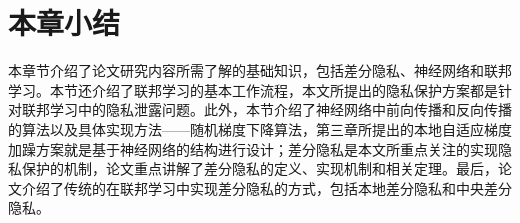 \section{本章小结}
本章节介绍了论文研究内容所需了解的基础知识，包括差分隐私、神经网络和联邦学习。本节还介绍了联邦学习的基本工作流程，本文所提出的隐私保护方案都是针对联邦学习中的隐私泄露问题。此外，本节介绍了神经网络中前向传播和反向传播的算法以及具体实现方法——随机梯度下降算法，第三章所提出的本地自适应梯度加躁方案就是基于神经网络的结构进行设计；差分隐私是本文所重点关注的实现隐私保护的机制，论文重点讲解了差分隐私的定义、实现机制和相关定理。最后，论文介绍了传统的在联邦学习中实现差分隐私的方式，包括本地差分隐私和中央差分隐私。